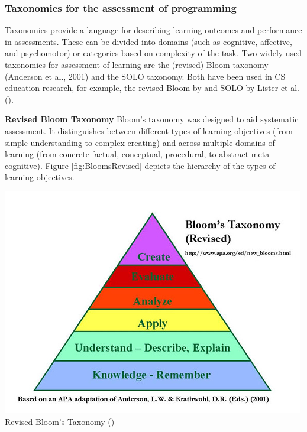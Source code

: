 \subsubsection{Taxonomies for the assessment of programming}\label{sec:taxProgramming}

Taxonomies provide a language for describing learning outcomes and performance in assessments. These can be divided into domains (such as cognitive, affective, and psychomotor) or categories based on complexity of the task. Two widely used taxonomies for assessment of learning are the (revised) Bloom taxonomy (Anderson et al., 2001) and the SOLO taxonomy. Both have been used in CS education research, for example, the revised Bloom by  and SOLO by Lister et al. (\cite{lister2006not}\cite{lister2010naturally}).

\noindent \textbf{Revised Bloom Taxonomy}\newline
Bloom's taxonomy was designed to aid systematic assessment. It distinguishes between different types of learning objectives (from simple understanding to complex creating) and across multiple domains of learning (from concrete factual, conceptual, procedural, to abstract meta-cognitive). Figure \ref{fig:BloomsRevised} depicts the hierarchy of the types of learning objectives.


\includegraphics[scale=0.6]{figures/bloomsrevised.jpg}
Revised Bloom's Taxonomy (\cite{krathwohl2002revision})


